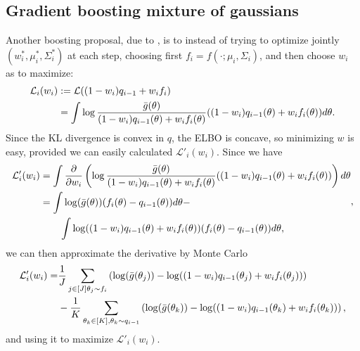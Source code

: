 \subsection{Gradient boosting mixture of gaussians}\label{gradboostsection}
Another boosting proposal, due to \cite{Guo_2016}, is to instead of trying to optimize jointly $(w_{i}^*,\mu_{i}^*,\Sigma_{i}^*)$ at each step, choosing first $f_{i} = f(\cdot;\mu_{i},\Sigma_{i})$, and then choose $w_i$ as to maximize:
\begin{equation}\label{boosting_objective_alpha}
\begin{split}
 \mathcal{L}_{i}(w_{i}) & := \mathcal{L}((1-w_{i}) q_{i-1} + w_{i}  f_{i}) \\
 & = \int \log \frac{{\bar{g}}(\theta)}
				 {(1-w_{i}) q_{i-1}(\theta) + w_{i} f_{i}(\theta)} ((1-w_{i}) q_{i-1}(\theta) + w_{i} f_{i}(\theta)) d\theta.
 \end{split}
\end{equation}
Since the KL divergence is convex in $q$, the ELBO is concave, so minimizing $w$ is easy, provided we can easily calculated $\mathcal{L}'_i(w_i)$. Since we have 
\begin{equation}\label{boosting_objective_dalpha}
\begin{split}
 \mathcal{L}'_{i}(w_{i}) & = 
	 \int \frac{\partial}{\partial w_{i}} \left( \log  \frac{{\bar{g}}(\theta)}
	 {(1-w_{i}) q_{i-1}(\theta) + w_{i} f_{i}(\theta)} ((1-w_{i}) q_{i-1}(\theta) + w_{i} f_{i}(\theta))\right) d\theta \\
	 & = \int \log ({\bar{g}}(\theta)) (f_{i}(\theta) - q_{i-1}(\theta)) d\theta - \\
	 & \qquad{} \int \log((1-w_{i}) q_{i-1}(\theta) + w_{i} f_{i}(\theta)) (f_i(\theta) - q_{i-1}(\theta)) d\theta,
\end{split},
\end{equation}
we can then approximate the derivative by Monte Carlo
\begin{equation}
\begin{split}
\mathcal{L}'_i(w_i) = & \frac{1}{J} \sum_{j \in [J] \theta_{j} \sim f_i} \left(\log({\bar{g}}(\theta_j)) - \log((1-w_{i}) q_{i-1}(\theta_j) + w_{i} f_{i}(\theta_j))\right) \\
& -\frac{1}{K} \sum_{\theta_{k} \in [K], \theta_k \sim q_{i-1}} \left(\log({\bar{g}}(\theta_k)) - \log((1-w_{i}) q_{i-1}(\theta_k) + w_{i} f_{i}(\theta_k))\right),
\end{split}
\end{equation}
and using it to maximize $\mathcal{L}'_i(w_i)$.

